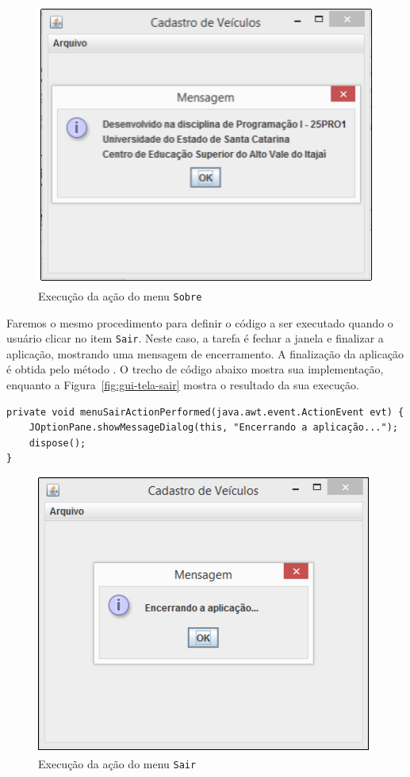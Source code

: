 \begin{figure}[h]
	\centering
	\includegraphics[width=0.4\textheight]{img/gui-tela-sobre}
	\caption{Execução da ação do menu \texttt{Sobre}}
	\label{fig:gui-tela-sobre}
\end{figure}

Faremos o mesmo procedimento para definir o código a ser executado quando o usuário clicar no item \texttt{Sair}. Neste caso, a tarefa é fechar a janela e finalizar a aplicação, mostrando uma mensagem de encerramento. A finalização da aplicação é obtida pelo método . O trecho de código abaixo mostra sua implementação, enquanto a Figura~\ref{fig:gui-tela-sair} mostra o resultado da sua execução.

\begin{verbatim}
private void menuSairActionPerformed(java.awt.event.ActionEvent evt) {
	JOptionPane.showMessageDialog(this, "Encerrando a aplicação...");
	dispose();
}
\end{verbatim}

\begin{figure}[h]
	\centering
	\includegraphics[width=0.4\textheight]{img/gui-tela-sair}
	\caption{Execução da ação do menu \texttt{Sair}}
	\label{fig:tela-sair}
\end{figure}

